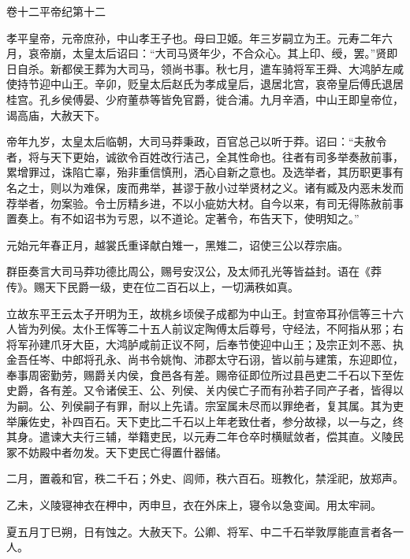\documentclass[12pt,UTF8]{ctexbook}
\begin{document}
卷十二平帝纪第十二



孝平皇帝，元帝庶孙，中山孝王子也。母曰卫姬。年三岁嗣立为王。元寿二年六月，哀帝崩，太皇太后诏曰：“大司马贤年少，不合众心。其上印、绶，罢。”贤即日自杀。新都侯王葬为大司马，领尚书事。秋七月，遣车骑将军王舜、大鸿胪左咸使持节迎中山王。辛卯，贬皇太后赵氏为孝成皇后，退居北宫，哀帝皇后傅氏退居桂宫。孔乡侯傅晏、少府董恭等皆免官爵，徙合浦。九月辛酒，中山王即皇帝位，谒高庙，大赦天下。



帝年九岁，太皇太后临朝，大司马莽秉政，百官总己以听于莽。诏曰：“夫赦令者，将与天下更始，诚欲令百姓改行洁己，全其性命也。往者有司多举奏赦前事，累增罪过，诛陷亡辜，殆非重信慎刑，洒心自新之意也。及选举者，其历职更事有名之士，则以为难保，废而弗举，甚谬于赦小过举贤材之义。诸有臧及内恶未发而荐举者，勿案验。令士厉精乡进，不以小疵妨大材。自今以来，有司无得陈赦前事置奏上。有不如诏书为亏恩，以不道论。定著令，布告天下，使明知之。”



元始元年春正月，越裳氏重译献白雉一，黑雉二，诏使三公以荐宗庙。



群臣奏言大司马莽功德比周公，赐号安汉公，及太师孔光等皆益封。语在《莽传》。赐天下民爵一级，吏在位二百石以上，一切满秩如真。



立故东平王云太子开明为王，故桃乡顷侯子成都为中山王。封宣帝耳孙信等三十六人皆为列侯。太仆王恽等二十五人前议定陶傅太后尊号，守经法，不阿指从邪；右将军孙建爪牙大臣，大鸿胪咸前正议不阿，后奉节使迎中山王；及宗正刘不恶、执金吾任岑、中郎将孔永、尚书令姚恂、沛郡太守石诩，皆以前与建策，东迎即位，奉事周密勤劳，赐爵关内侯，食邑各有差。赐帝征即位所过县邑吏二千石以下至佐史爵，各有差。又令诸侯王、公、列侯、关内侯亡子而有孙若子同产子者，皆得以为嗣。公、列侯嗣子有罪，耐以上先请。宗室属未尽而以罪绝者，复其属。其为吏举廉佐史，补四百石。天下吏比二千石以上年老致仕者，参分故禄，以一与之，终其身。遣谏大夫行三辅，举籍吏民，以元寿二年仓卒时横赋敛者，偿其直。义陵民冢不妨殿中者勿发。天下吏民亡得置什器储。



二月，置羲和官，秩二千石；外史、闾师，秩六百石。班教化，禁淫祀，放郑声。



乙未，义陵寝神衣在柙中，丙申旦，衣在外床上，寝令以急变闻。用太牢祠。



夏五月丁巳朔，日有蚀之。大赦天下。公卿、将军、中二千石举敦厚能直言者各一人。
\end{document}
